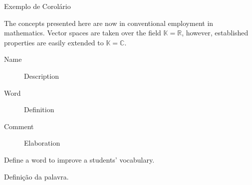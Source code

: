 
        Exemplo de Corolário
        \begin{corollary}
            The concepts presented here are now in conventional employment in mathematics. Vector spaces are taken over the field $\mathbb{K}=\mathbb{R}$, however, established properties are easily extended to $\mathbb{K}=\mathbb{C}$.
        \end{corollary}






            \begin{description}
                \item[Name] Description
                \item[Word] Definition
                \item[Comment] Elaboration
            \end{description}


        Define a word to improve a students' vocabulary.

        \begin{vocabulary}[Palavra]
            Definição da palavra.
        \end{vocabulary}